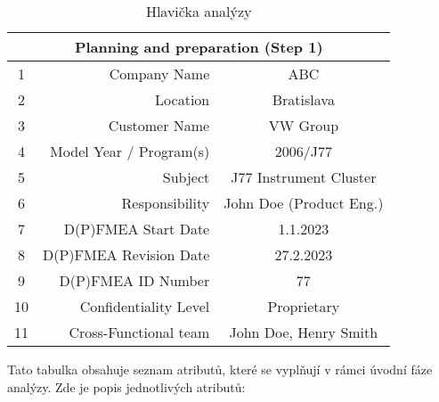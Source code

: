 \begin{center}
\begin{table}
	\centering
	\caption{Hlavička analýzy}
	\label{tab:Head1}
        \begin{tabular}{|c | r | c |} 
         \hline
 \multicolumn{3}{|c|}{Planning and preparation (Step 1)} \\

         \hline
         1 & Company Name & ABC  \\ [0.5ex] 
         \hline
         2 & Location & Bratislava  \\ [0.5ex] 
         \hline
         3 & Customer Name & VW Group  \\ [0.5ex] 
         \hline
         4 & Model Year / Program(s) & 2006/J77 \\ [0.5ex] 
         \hline
         5 & Subject & J77 Instrument Cluster \\ [0.5ex] 
         \hline
         6 & Responsibility & John Doe (Product Eng.) \\ [0.5ex] 
         \hline
         7 & D(P)FMEA Start Date & 1.1.2023  \\ [0.5ex] 
         \hline
         8 & D(P)FMEA Revision Date & 27.2.2023 \\ [0.5ex] 
         \hline
         9 & D(P)FMEA ID Number & 77 \\ [0.5ex] 
         \hline
         10 & Confidentiality Level & Proprietary \\ [0.5ex] 
         \hline
         11 & Cross-Functional team & John Doe, Henry Smith \\ [0.5ex] 
         \hline
        \end{tabular}
    \end{table}
\end{center}

Tato tabulka obsahuje seznam atributů, které se vyplňují v rámci úvodní fáze analýzy. Zde je popis jednotlivých atributů:


